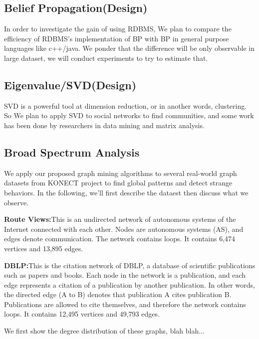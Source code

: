\subsection{Belief Propagation(Design)}
In order to investigate the gain of using RDBMS, We plan to compare the efficiency of RDBMS's implementation of BP with BP in general purpose languages like c++/java. We ponder that the difference will be only observable in large dataset, we will conduct experiments to try to estimate that. 

\subsection{Eigenvalue/SVD(Design)}
SVD is a powerful tool at dimension reduction, or in another words, clustering. So We plan to apply SVD to social networks to find communities, and some work has been done by researchers in data mining and matrix analysis. 

\subsection{Broad Spectrum Analysis}
We apply our proposed graph mining algorithms to several real-world graph datasets from KONECT project to find global patterns and detect strange behaviors. In the following, we'll first describe the dataest then discuss  what we observe. 

\begin{description}
	\item{{\bf Route Views\cite{konect:2013:as20000102, konect:DBLP}:}}{This is an undirected network of autonomous systems of the Internet connected with each other. Nodes are autonomous systems (AS), and edges denote communication. The network contains loops. It contains 6,474 vertices and 13,895 edges.}
	\item{{\bf DBLP\cite{konect:2013:dblp-cite, konect:DBLP}:}}{This is the citation network of DBLP, a database of scientific publications such as papers and books. Each node in the network is a publication, and each edge represents a citation of a publication by another publication. In other words, the directed edge (A to B) denotes that publication A cites publication B. Publications are allowed to cite themselves, and therefore the network contains loops. It contains 12,495 vertices and 49,793 edges.}
\end{description}

We first show the degree distribution of these graphs, blah blah...

